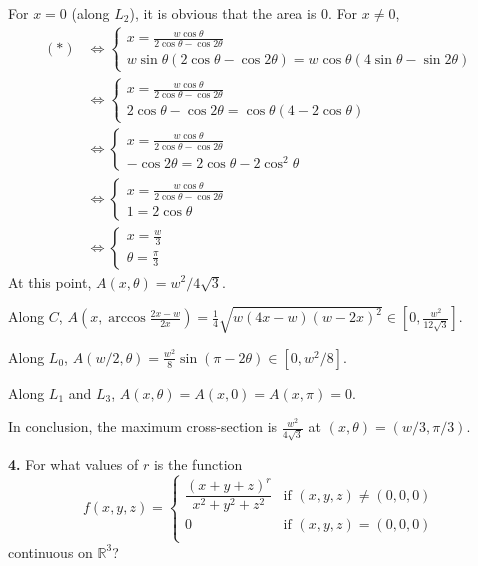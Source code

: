 \documentclass[a4paper,12pt]{article}
\newcommand{\exercise}[1]{\noindent\textbf{#1.}}
\begin{document}
For $x = 0$ (along $L_2$), it is obvious that the area is 0. For $x \neq 0$,
\begin{align*}
  (*) &\iff
  \begin{cases}
    x = \frac{w\cos\theta}{2\cos\theta - \cos2\theta}\\
    w\sin\theta(2\cos\theta-\cos2\theta) = w\cos\theta(4\sin\theta-\sin2\theta)
  \end{cases}\\
  &\iff
  \begin{cases}
    x = \frac{w\cos\theta}{2\cos\theta - \cos2\theta}\\
    2\cos\theta - \cos2\theta = \cos\theta(4 - 2\cos\theta)
  \end{cases}\\
  &\iff
  \begin{cases}
    x = \frac{w\cos\theta}{2\cos\theta - \cos2\theta}\\
    -\cos2\theta = 2\cos\theta - 2\cos^2\theta
  \end{cases}\\
  &\iff
  \begin{cases}
    x = \frac{w\cos\theta}{2\cos\theta - \cos2\theta}\\
    1 = 2\cos\theta
  \end{cases}\\
  &\iff
  \begin{cases}
    x = \frac{w}{3}\\
    \theta = \frac{\pi}{3}
  \end{cases}
\end{align*}
At this point, $A(x, \theta) = w^2/4\sqrt3$.

Along $C$, $A\left(x, \arccos\frac{2x-w}{2x}\right)
= \frac{1}{4}\sqrt{w(4x-w)(w-2x)^2} \in \left[0, \frac{w^2}{12\sqrt3}\right]$.

Along $L_0$, $A(w/2, \theta)
= \frac{w^2}{8}\sin(\pi - 2\theta) \in [0, w^2/8]$.

Along $L_1$ and $L_3$, $A(x, \theta) = A(x, 0) = A(x, \pi) = 0$.

In conclusion, the maximum cross-section is $\frac{w^2}{4\sqrt3}$
at $(x, \theta) = (w/3, \pi/3)$.

\exercise{4} For what values of $r$ is the function
\[f(x, y, z) =
\begin{cases}
  \dfrac{(x + y + z)^r}{x^2 + y^2 + z^2}&\text{if }(x, y, z) \neq (0, 0, 0)\\
  0&\text{if }(x, y, z) = (0, 0, 0)\\
\end{cases}\]
continuous on $\mathbb{R}^3$?
\end{document}
